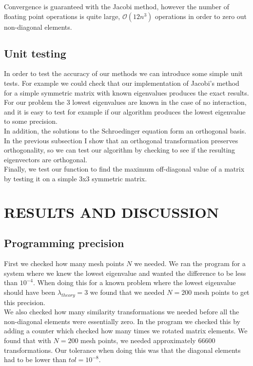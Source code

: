 \documentclass[%
 reprint,
 nobalancelastpage,
 amsmath,amssymb,
 aps,
]{revtex4-1}
\begin{document}
Convergence is guaranteed with the Jacobi method, however the number of floating point operations is quite large, $\mathcal{O}(12n^{3})$ operations in order to zero out non-diagonal elements.

\subsection{Unit testing}
In order to test the accuracy of our methods we can introduce some simple unit tests. For example we could check that our implementation of Jacobi's method for a simple symmetric matrix with known eigenvalues produces the exact results. For our problem the 3 lowest eigenvalues are known in the case of no interaction, and it is easy to test for example if our algorithm produces the lowest eigenvalue to some precision. \\
In addition, the solutions to the Schroedinger equation form an orthogonal basis. In the previous subsection I show that an orthogonal transformation preserves orthogonality, so we can test our algorithm by checking to see if the resulting eigenvectors are orthogonal.\\
Finally, we test our function to find the maximum off-diagonal value of a matrix by testing it on a simple 3x3 symmetric matrix.


\section{RESULTS AND DISCUSSION}

\subsection{Programming precision}


First we checked how many mesh points $N$ we needed. We ran the program for a system where we knew the lowest eigenvalue and wanted the difference to be less than $10^{-4}$. When doing this for a known problem where the lowest eigenvalue should have been $\lambda_{theory} = 3$ we found that we needed $N=200$ mesh points to get this precision.\\
We also checked how many similarity transformations we needed before all the non-diagonal elements were essentially zero. In the program we checked this by adding a counter which checked how many times we rotated matrix elements. We found that with $N= 200$ mesh points, we needed approximately $66600$ transformations. Our tolerance when doing this was that the diagonal elements had to be lower than $tol = 10^{-8}$.\\
\end{document}
